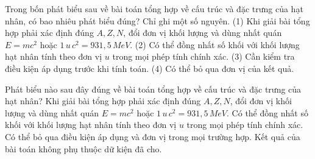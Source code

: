 \begin{ex}
Trong bốn phát biểu sau về bài toán tổng hợp về cấu trúc và đặc trưng của hạt nhân, có bao nhiêu phát biểu đúng? Chỉ ghi một số nguyên. (1) Khi giải bài tổng hợp phải xác định đúng $A,Z,N$, đổi đơn vị khối lượng và dùng nhất quán $E=mc^2$ hoặc $1\,u\,c^2=931,5\,MeV$. (2) Có thể đồng nhất số khối với khối lượng hạt nhân tính theo đơn vị $u$ trong mọi phép tính chính xác. (3) Cần kiểm tra điều kiện áp dụng trước khi tính toán. (4) Có thể bỏ qua đơn vị của kết quả.
\end{ex}

\begin{ex}
Phát biểu nào sau đây đúng về bài toán tổng hợp về cấu trúc và đặc trưng của hạt nhân?
\choice
{\True Khi giải bài tổng hợp phải xác định đúng $A,Z,N$, đổi đơn vị khối lượng và dùng nhất quán $E=mc^2$ hoặc $1\,u\,c^2=931,5\,MeV$.}
{Có thể đồng nhất số khối với khối lượng hạt nhân tính theo đơn vị $u$ trong mọi phép tính chính xác.}
{Có thể bỏ qua điều kiện áp dụng và đơn vị trong mọi trường hợp.}
{Kết quả của bài toán không phụ thuộc dữ kiện đã cho.}
\end{ex}

